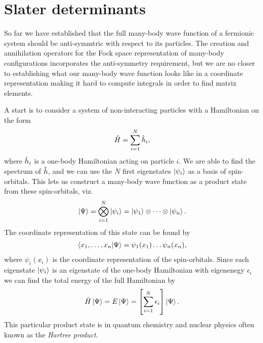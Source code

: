     \section{Slater determinants}
        So far we have established that the full many-body wave function of a
        fermionic system should be anti-symmtric with respect to its particles.
        The creation and annihilation operators for the Fock space
        representation of many-body configurations incorporates the
        anti-symmetry requirement, but we are no closer to establishing what our
        many-body wave function looks like in a coordinate representation making
        it hard to compute integrals in order to find matrix elements.

        A start is to consider a system of non-interacting particles with a
        Hamiltonian on the form
        \begin{align}
            \hat{H} = \sum_{i = 1}^{N} \hat{h}_i,
        \end{align}
        where $\hat{h}_i$ is a one-body Hamiltonian acting on particle $i$. We
        are able to find the spectrum of $\hat{h}$, and we can use the $N$
        first eigenstates $\ket{\psi_i}$ as a basis of spin-orbitals.
        This lets us construct a many-body wave function as a product state from
        these spin-orbitals, viz.
        \begin{align}
            \ket{\Psi}
            = \bigotimes_{i = 1}^{N}\ket{\psi_i}
            = \ket{\psi_1}\otimes\dots\otimes\ket{\psi_n}.
        \end{align}
        The coordinate representation of this state can be found by
        \begin{align}
            \braket{x_1, \dots, x_n}{\Psi}
            = \psi_1(x_1)\dots\psi_n(x_n),
        \end{align}
        where $\psi_i(x_i)$ is the coordinate representation of the
        spin-orbitals.
        Since each eigenstate $\ket{\psi_i}$ is an eigenstate of the one-body
        Hamiltonian with eigenenegy $\epsilon_i$ we can find the total energy of
        the full Hamiltonian by
        \begin{align}
            \hat{H}\ket{\Psi}
            = E\ket{\Psi}
            = \left[ 
                \sum_{i = 1}^{N}
                \epsilon_i
             \right]\ket{\Psi}.
        \end{align}
        This particular product state is in quantum chemistry and nuclear
        physics often known as the \emph{Hartree product}.
